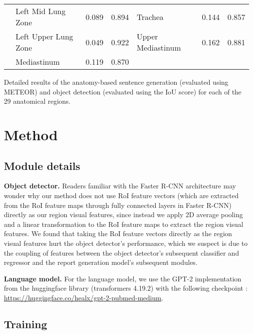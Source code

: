 \documentclass[10pt,twocolumn,letterpaper]{article}
\begin{document}
{{\begin{tabular}{c||l|c|c||l|c|c}
                                  & Left Mid Lung Zone                     & 0.089  & 0.894  & Trachea                  & 0.144  & 0.857 \\
                                  & Left Upper Lung Zone                   & 0.049  & 0.922  & Upper Mediastinum        & 0.162  & 0.881 \\
                                  & Mediastinum                            & 0.119  & 0.870                    \\\hline                   
\end{tabular}
}
\caption{Detailed results of the anatomy-based sentence generation (evaluated using METEOR) and object detection (evaluated using the IoU score) for each of the 29 anatomical regions.}
\label{tab:detailed-anatomy-level-results}
}

\twocolumn
\section{Method}\label{appendix:method}

\subsection{Module details}

\noindent\textbf{Object detector.} Readers familiar with the Faster R-CNN \cite{ren2015faster} architecture may wonder why our method does not use RoI feature vectors (which are extracted from the RoI feature maps through fully connected layers in Faster R-CNN) directly as our region visual features, since instead we apply 2D average pooling and a linear transformation to the RoI feature maps to extract the region visual features. We found that taking the RoI feature vectors directly as the region visual features hurt the object detector's performance, which we suspect is due to the coupling of features between the object detector’s subsequent classifier and regressor and the report generation model’s subsequent modules.

\noindent\textbf{Language model.} For the language model, we use the GPT-2 implementation from the huggingface library (transformers 4.19.2) \cite{wolf2020transformers} with the following checkpoint \cite{papanikolaou2020dare}: \url{https://huggingface.co/healx/gpt-2-pubmed-medium}. 


\subsection{Training}
\label{training}
\end{document}
